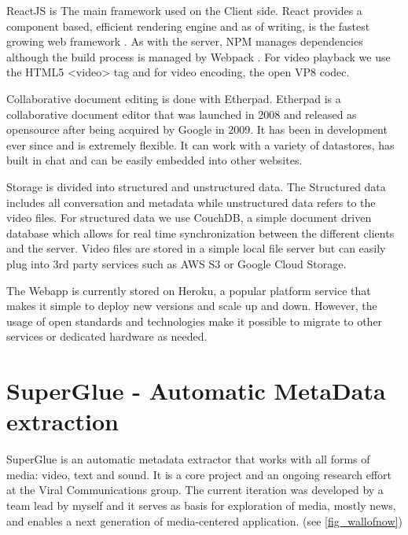 ReactJS is The main framework used on the Client side. React provides a component based, efficient rendering engine and as of writing, is the fastest growing web framework \cite{reactjs}. As with the server, NPM manages dependencies although the build process is managed by Webpack \cite{webpack}. For video playback we use the HTML5 <video> tag and for video encoding, the open VP8\cite{vp8} codec. 

Collaborative document editing is done with Etherpad\cite{etherpad}. Etherpad is a collaborative document editor that was launched in 2008 and released as opensource after being acquired by Google in 2009. It has been in development ever since and is extremely flexible. It can work with a variety of datastores, has built in chat and can be easily embedded into other websites.

Storage is divided into structured and unstructured data. The Structured data includes all conversation and metadata while unstructured data refers to the video files. For structured data we use CouchDB\cite{couchdb}, a simple document driven database which allows for real time synchronization between the different clients and the server.  Video files are stored in a simple local file server but can easily plug into 3rd party services such as AWS S3 or Google Cloud Storage.

The Webapp is currently stored on Heroku\cite{heroku}, a popular platform service that makes it simple to deploy new versions and scale up and down. However, the usage of open standards and technologies make it possible to migrate to other services or dedicated hardware as needed. 

\section{SuperGlue - Automatic MetaData extraction}
SuperGlue\cite{superglue} is an automatic metadata extractor that works with all forms of media: video, text and sound. It is a core project and an ongoing research effort at the Viral Communications group. The current iteration was developed by a team lead by myself and it serves as basis for exploration of media, mostly news, and enables a next generation of media-centered application. (see \autoref{fig_wallofnow})

